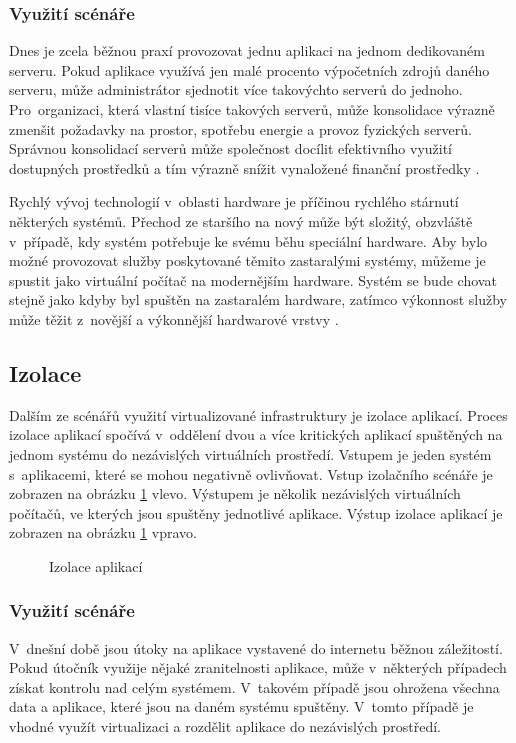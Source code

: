 \subsubsection{Využití scénáře}
\label{chapter:virtualization:deployment:consolidation:use}
Dnes je zcela běžnou praxí provozovat jednu aplikaci na jednom dedikovaném serveru. Pokud aplikace využívá jen malé procento
výpočetních zdrojů daného serveru, může administrátor sjednotit více takovýchto serverů do jednoho. Pro~organizaci, která vlastní
tisíce takových serverů, může konsolidace výrazně zmenšit požadavky na prostor, spotřebu energie a provoz fyzických serverů.
Správnou konsolidací serverů může společnost docílit efektivního využití dostupných prostředků a tím výrazně snížit vynaložené
finanční prostředky \cite{oracle:virtualization:reasons}.

Rychlý vývoj technologií v~oblasti hardware je příčinou rychlého stárnutí některých systémů. Přechod ze staršího na nový může
být složitý, obzvláště v~případě, kdy systém potřebuje ke svému běhu speciální hardware. Aby bylo možné provozovat služby poskytované
těmito zastaralými systémy, můžeme je spustit jako virtuální počítač na modernějším hardware. Systém se bude chovat stejně jako
kdyby byl spuštěn na zastaralém hardware, zatímco výkonnost služby může těžit z~novější a výkonnější hardwarové vrstvy
\cite{oracle:virtualization:reasons}.
\subsection{Izolace}
\label{chapter:virtualization:deployment:isolation}
Dalším ze scénářů využití virtualizované infrastruktury je izolace aplikací. Proces izolace aplikací spočívá v~oddělení dvou
a více kritických aplikací spuštěných na jednom systému do nezávislých virtuálních prostředí. Vstupem je jeden systém
s~aplikacemi, které se mohou negativně ovlivňovat. Vstup izolačního scénáře je zobrazen na obrázku \ref{figure:isolation} vlevo.
Výstupem je několik nezávislých virtuálních počítačů, ve kterých jsou spuštěny jednotlivé aplikace. Výstup izolace aplikací
je zobrazen na obrázku \ref{figure:isolation} vpravo.
\begin{figure}
    \centering    
    \caption{Izolace aplikací}
    \label{figure:isolation}
\end{figure}
\subsubsection{Využití scénáře}
\label{chapter:virtualization:deployment:isolation:use}
V~dnešní době jsou útoky na aplikace vystavené do internetu běžnou záležitostí. Pokud útočník využije nějaké zranitelnosti 
aplikace, může v~některých případech získat kontrolu nad celým systémem. V~takovém případě jsou ohrožena všechna data a 
aplikace, které jsou na daném systému spuštěny. V~tomto případě je vhodné využít virtualizaci a rozdělit aplikace do nezávislých
prostředí.

